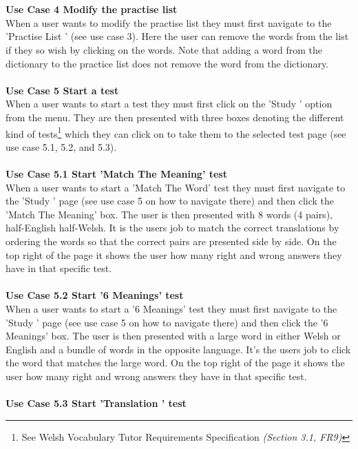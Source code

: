 \documentclass{project}
\newcommand*{\icon}[1]{%
  \raisebox{-.3\baselineskip}{%
    \texttt{[image: \#1]}%
  }%
}
\begin{document}
\\\\
\textbf{Use Case 4 Modify the practise list}
\\
When a user wants to modify the practise list they must first navigate to the 'Practise List \icon{practise-icon}' (see use case 3). Here the user can remove the words from the list if they so wish by clicking on the words. Note that adding a word from the dictionary to the practice list does not remove the word from the dictionary.
\\\\
\textbf{Use Case 5 Start a test}
\\
When a user wants to start a test they must first click on the 'Study \icon{study-icon}' option from the menu. They are then presented with three boxes denoting the different kind of tests\footnote{See Welsh Vocabulary Tutor Requirements Specification\cite{se.qa.csrs} \textit{(Section 3.1, FR9)}} which they can click on to take them to the selected test page (see use case 5.1, 5.2, and 5.3).
\\\\
\textbf{Use Case 5.1 Start 'Match The Meaning' test}
\\
When a user wants to start a 'Match The Word' test they must first navigate to the 'Study \icon{study-icon}' page (see use case 5 on how to navigate there) and then click the 'Match The Meaning' box. The user is then presented with 8 words (4 pairs), half-English half-Welsh. It is the users job to match the correct translations by ordering the words so that the correct pairs are presented side by side. On the top right of the page it shows the user how many right and wrong answers they have in that specific test.
\\\\
\textbf{Use Case 5.2 Start '6 Meanings' test}
\\
When a user wants to start a '6 Meanings' test they must first navigate to the 'Study \icon{study-icon}' page (see use case 5 on how to navigate there) and then click the '6 Meanings' box. The user is then presented with a large word in either Welsh or English and a bundle of words in the opposite language. It's the users job to click the word that matches the large word. On the top right of the page it shows the user how many right and wrong answers they have in that specific test.
\\\\
\textbf{Use Case 5.3 Start 'Translation ' test}
\\
\end{document}
